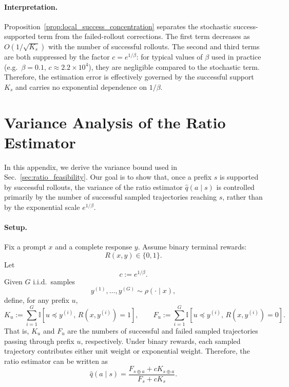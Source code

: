 \documentclass{article}
\begin{document}
\paragraph{Interpretation.}
Proposition~\ref{prop:local_success_concentration} separates the stochastic
success-supported term from the failed-rollout corrections.
The first term decreases as $O(1/\sqrt{K_s})$ with the number of successful
rollouts. The second and third terms are both suppressed by the factor
$c=e^{1/\beta}$: for typical values of $\beta$ used in practice
(e.g.\ $\beta=0.1$, $c\approx 2.2\times 10^4$), they are negligible
compared to the stochastic term.
Therefore, the estimation error is effectively governed by the successful
support $K_s$ and carries no exponential dependence on $1/\beta$.


\section{Variance Analysis of the Ratio Estimator}
\label{app:ratio_estimation}

In this appendix, we derive the variance bound used in Sec.~\ref{sec:ratio_feasibility}. Our goal is to show that, once a prefix $s$ is supported by successful rollouts, the variance of the ratio estimator $\widehat q(a \mid s)$ is controlled primarily by the number of successful sampled trajectories reaching $s$, rather than by the exponential scale $e^{1/\beta}$.

\paragraph{Setup.}
Fix a prompt $x$ and a complete response $y$. Assume binary terminal rewards:
\begin{equation}
R(x,y)\in\{0,1\}.
\end{equation}
Let
\begin{equation}
c := e^{1/\beta}.
\end{equation}
Given $G$ i.i.d.\ samples
\begin{equation}
y^{(1)},\ldots,y^{(G)} \sim \rho(\cdot \mid x),
\end{equation}
define, for any prefix $u$,
\begin{equation}
K_u
:=
\sum_{i=1}^G
\mathbb{I}[u \preceq y^{(i)},\, R(x,y^{(i)})=1],
\qquad
F_u
:=
\sum_{i=1}^G
\mathbb{I}[u \preceq y^{(i)},\, R(x,y^{(i)})=0].
\label{eq:appendix_prefix_counts}
\end{equation}
That is, $K_u$ and $F_u$ are the numbers of successful and failed sampled trajectories passing through prefix $u$, respectively. Under binary rewards, each sampled trajectory contributes either unit weight or exponential weight. Therefore, the ratio estimator can be written as
\begin{equation}
\widehat q(a \mid s)
=
\frac{F_{s\oplus a}+cK_{s\oplus a}}{F_s+cK_s}.
\label{eq:appendix_qhat_counts}
\end{equation}
\end{document}
